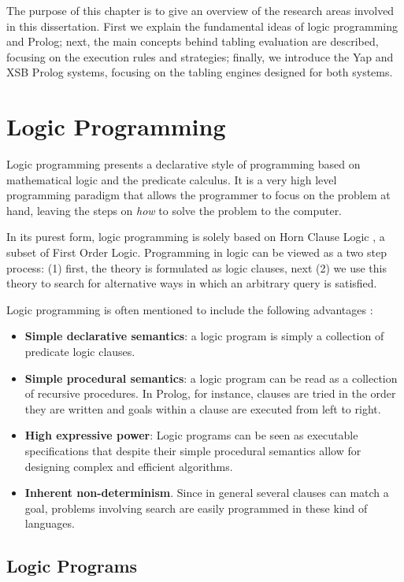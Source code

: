 
The purpose of this chapter is to give an overview of the research areas
involved in this dissertation. First we explain the fundamental ideas of logic
programming and Prolog; next, the main concepts behind tabling evaluation are described,
focusing on the execution rules and strategies; finally, we introduce
the Yap and XSB Prolog systems, focusing on the tabling engines designed for both systems.

\section{Logic Programming}

Logic programming presents a declarative style of programming based on mathematical
logic and the predicate calculus. It is a very high level programming
paradigm that allows the programmer to focus on the problem at hand, leaving the
steps on \textit{how} to solve the problem to the computer.

In its purest form, logic programming is solely based on Horn Clause Logic \cite{Lloyd-87},
a subset of First Order Logic. Programming in logic can be viewed as
a two step process: (1) first, the theory is formulated as logic clauses,
next (2) we use this theory to search for alternative ways in which an arbitrary query is satisfied.

Logic programming is often mentioned to include the following advantages \cite{Carlsson-PhD}:

\begin{itemize}
  \item \textbf{Simple declarative semantics}: a logic program is simply a collection of predicate logic clauses.
  \item \textbf{Simple procedural semantics}: a logic program can be read as a collection of recursive procedures. In Prolog, for instance, clauses are tried in the order they are written and goals within a clause are executed from left to right.
  \item \textbf{High expressive power}: Logic programs can be seen as executable specifications that despite their simple procedural semantics allow for designing complex and efficient algorithms.
  \item \textbf{Inherent non-determinism}. Since in general several clauses can match a goal, problems involving search are easily programmed in these kind of languages.
\end{itemize}

\subsection{Logic Programs}

